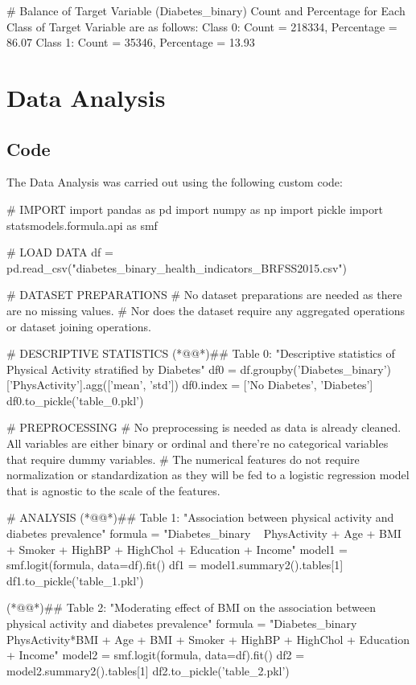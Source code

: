 \documentclass[11pt]{article}
\begin{document}
\begin{codeoutput}
# Balance of Target Variable (Diabetes_binary)
Count and Percentage for Each Class of Target Variable are as follows:
Class 0: Count = 218334, Percentage = 86.07            %
Class 1: Count = 35346, Percentage = 13.93             %

\end{codeoutput}

\section{Data Analysis}
\subsection{{Code}}
The Data Analysis was carried out using the following custom code:

\begin{python}

# IMPORT
import pandas as pd
import numpy as np
import pickle
import statsmodels.formula.api as smf

# LOAD DATA
df = pd.read_csv("diabetes_binary_health_indicators_BRFSS2015.csv")

# DATASET PREPARATIONS
# No dataset preparations are needed as there are no missing values.
# Nor does the dataset require any aggregated operations or dataset joining operations.

# DESCRIPTIVE STATISTICS
(*@@*)## Table 0: "Descriptive statistics of Physical Activity stratified by Diabetes"
df0 = df.groupby('Diabetes_binary')['PhysActivity'].agg(['mean', 'std'])
df0.index = ['No Diabetes', 'Diabetes']
df0.to_pickle('table_0.pkl')

# PREPROCESSING
# No preprocessing is needed as data is already cleaned. All variables are either binary or ordinal and there're no categorical variables that require dummy variables.
# The numerical features do not require normalization or standardization as they will be fed to a logistic regression model that is agnostic to the scale of the features.

# ANALYSIS
(*@@*)## Table 1: "Association between physical activity and diabetes prevalence"
formula = "Diabetes_binary ~ PhysActivity + Age + BMI + Smoker + HighBP + HighChol + Education + Income"
model1 = smf.logit(formula, data=df).fit()
df1 = model1.summary2().tables[1]
df1.to_pickle('table_1.pkl')

(*@@*)## Table 2: "Moderating effect of BMI on the association between physical activity and diabetes prevalence"
formula = "Diabetes_binary ~ PhysActivity*BMI + Age + BMI + Smoker + HighBP + HighChol + Education + Income"
model2 = smf.logit(formula, data=df).fit()
df2 = model2.summary2().tables[1] 
df2.to_pickle('table_2.pkl')


\end{python}
\end{document}
